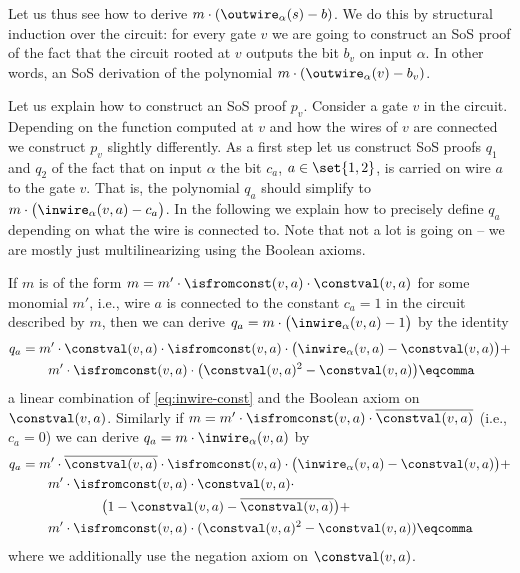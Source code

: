 Let us thus see how to derive $m \cdot \left( \outwire_\alpha(s) - b\right)$.
We do this by structural induction over the circuit: for every gate
$v$ we are going to construct an SoS proof of the fact that the
circuit rooted at $v$ outputs the bit $b_v$ on input $\alpha$. In
other words, an SoS derivation of the polynomial
$m \cdot \left(\outwire_\alpha(v) - b_v\right)$.


Let us explain how to construct an SoS proof $p_v$. Consider a gate
$v$ in the circuit. Depending on the function computed at $v$ and how
the wires of $v$ are connected we construct $p_v$ slightly differently.
As a first step let us construct SoS proofs $q_1$ and $q_2$ of the
fact that on input $\alpha$ the bit $c_a$, $a \in \set{1,2}$, is
carried on wire $a$ to the gate $v$. That is, the polynomial $q_a$
should simplify to $m \cdot \big(\inwire_\alpha(v, a) - c_a\big)$. In
the following we explain how to precisely define $q_a$ depending on
what the wire is connected to. Note that not a lot is going on -- we
are mostly just multilinearizing using the Boolean axioms.

If $m$ is of the form $m = m' \cdot \isfromconst(v,a) \cdot \constval(v, a)$ for some monomial $m'$, i.e., wire $a$
is connected to the constant $c_a = 1$ in the circuit described by $m$, then we
can derive $q_a = m \cdot \big(\inwire_{\alpha}(v,a) - 1\big)$
by the identity
\begin{align}
  \nonumber
  q_a &= m' \cdot \constval(v,a) \cdot \isfromconst(v,a) \cdot \big(\inwire_{\alpha}(v,a) -
        \constval(v, a)\big) +\\
      &\qquad m' \cdot \isfromconst(v,a) \cdot
        \big( \constval(v,a)^2 - \constval(v,a)\big) \eqcomma
\end{align}
a linear combination of \cref{eq:inwire-const} and the Boolean axiom on $\constval(v,a)$.  Similarly if $m = m' \cdot \isfromconst(v,a) \cdot \overline{\constval(v,a)}$ (i.e., $c_a = 0$) we can derive $q_a = m \cdot \inwire_{\alpha}(v,a)$ by
\begin{align}
  \nonumber
  q_a &= m' \cdot \overline{\constval(v,a)} \cdot \isfromconst(v,a) \cdot \big(\inwire_{\alpha}(v,a) -
        \constval(v, a)\big) +\\\nonumber
      &\qquad m' \cdot \isfromconst(v,a) \cdot \constval(v,a) \cdot
         \\\nonumber
      &\qquad\qquad\qquad \big( 1 - \constval(v,a) - \overline{\constval(v,a)}\big) +\\
      &\qquad m' \cdot \isfromconst(v,a) \cdot (\constval(v,a)^2 - \constval(v,a))
        \eqcomma
\end{align}
where we additionally use the negation axiom on $\constval(v,a)$.

